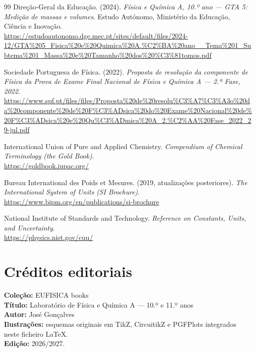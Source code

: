 \documentclass[11pt,a4paper,openany]{book}
\begin{document}
\begin{thebibliography}{99}
Direção-Geral da Educação. (2024). \textit{Física e Química A, 10.º ano — GTA 5: Medição de massas e volumes}. Estudo Autónomo, Ministério da Educação, Ciência e Inovação.\\
\url{https://estudoautonomo.dge.mec.pt/sites/default/files/2024-12/GTA%205_Fisica%20e%20Quimica%20A.%C2%BA%20ano__Tema%201_Subtema%201_Massa%20e%20Tamanho%20dos%20%C3%81tomos.pdf}

Sociedade Portuguesa de Física. (2022). \textit{Proposta de resolução da componente de Física da Prova de Exame Final Nacional de Física e Química A — 2.ª Fase, 2022}.\\
\url{https://www.spf.pt/files/files/Proposta%20de%20resolu%C3%A7%C3%A3o%20da%20componente%20de%20F%C3%ADsica%20do%20Exame%20Nacional%20de%20F%C3%ADsica%20e%20Qu%C3%ADmica%20A_2.%C2%AA%20Fase_2022_29-jul.pdf}

International Union of Pure and Applied Chemistry. \textit{Compendium of Chemical Terminology (the Gold Book)}.\\
\url{https://goldbook.iupac.org/}

Bureau International des Poids et Mesures. (2019, atualizações posteriores). \textit{The International System of Units (SI Brochure)}.\\
\url{https://www.bipm.org/en/publications/si-brochure}

National Institute of Standards and Technology. \textit{Reference on Constants, Units, and Uncertainty}.\\
\url{https://physics.nist.gov/cuu/}

\end{thebibliography}

\chapter*{Créditos editoriais}
\textbf{Coleção:} EUFISICA books\\
\textbf{Título:} Laboratório de Física e Química A — 10.º e 11.º anos\\
\textbf{Autor:} José Gonçalves\\
\textbf{Ilustrações:} esquemas originais em TikZ, CircuitikZ e PGFPlots integrados neste ficheiro LaTeX.\\
\textbf{Edição:} 2026/2027.
\end{document}
